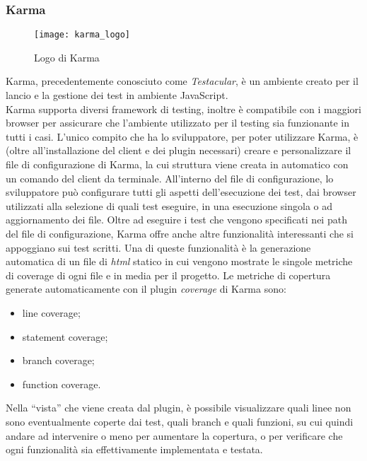 \subsubsection{Karma}
\begin{figure}[htb] 
    \centering 
    \texttt{[image: karma\_logo]} 
    \caption{Logo di Karma}
\end{figure}
Karma, precedentemente conosciuto come \emph{Testacular}, è un ambiente creato per il lancio e la gestione dei test in ambiente JavaScript.\\
Karma supporta diversi framework di testing, inoltre è compatibile con i maggiori browser per assicurare che l’ambiente utilizzato per il testing sia funzionante in tutti i casi. 
L’unico compito che ha lo sviluppatore, per poter utilizzare Karma, è (oltre all’installazione del client e dei plugin necessari) creare e personalizzare il file di configurazione di Karma, la cui struttura viene creata in automatico con un comando del client da terminale. 
All’interno del file di configurazione, lo sviluppatore può configurare tutti gli aspetti dell’esecuzione dei test, dai browser utilizzati alla selezione di quali test eseguire, in una esecuzione singola o ad aggiornamento dei file. 
Oltre ad eseguire i test che vengono specificati nei path del file di configurazione, Karma offre anche altre funzionalità interessanti che si appoggiano sui test scritti. Una di queste funzionalità è la generazione automatica di un file di \emph{html} statico in cui vengono mostrate le singole metriche di coverage di ogni file e in media per il progetto. Le metriche di copertura generate automaticamente con il plugin \emph{coverage} di Karma sono:
\begin{itemize}
	\item line coverage;
	\item statement coverage;
	\item branch coverage;
	\item function coverage.
\end{itemize}
Nella “vista” che viene creata dal plugin, è possibile visualizzare quali linee non sono eventualmente coperte dai test, quali branch e quali funzioni, su cui quindi andare ad intervenire o meno per aumentare la copertura, o per verificare che ogni funzionalità sia effettivamente implementata e testata.

